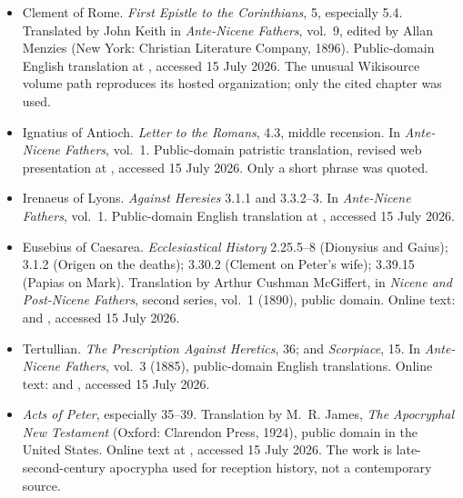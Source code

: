 \begin{itemize}
\item Clement of Rome. \emph{First Epistle to the Corinthians}, 5, especially
  5.4. Translated by John Keith in \emph{Ante-Nicene Fathers}, vol.~9, edited
  by Allan Menzies (New York: Christian Literature Company, 1896).
  Public-domain English translation at
  ,
  accessed 15 July 2026. The unusual Wikisource volume path reproduces its
  hosted organization; only the cited chapter was used.

\item Ignatius of Antioch. \emph{Letter to the Romans}, 4.3, middle recension.
  In \emph{Ante-Nicene Fathers}, vol.~1. Public-domain patristic translation,
  revised web presentation at
  , accessed
  15 July 2026. Only a short phrase was quoted.

\item Irenaeus of Lyons. \emph{Against Heresies} 3.1.1 and 3.3.2--3. In
  \emph{Ante-Nicene Fathers}, vol.~1. Public-domain English translation at
  ,
  accessed 15 July 2026.

\item Eusebius of Caesarea. \emph{Ecclesiastical History} 2.25.5--8
  (Dionysius and Gaius); 3.1.2 (Origen on the deaths); 3.30.2 (Clement on
  Peter's wife); 3.39.15 (Papias on Mark). Translation by Arthur Cushman
  McGiffert, in \emph{Nicene and Post-Nicene Fathers}, second series, vol.~1
  (1890), public domain. Online text:
   and
  , accessed
  15 July 2026.

\item Tertullian. \emph{The Prescription Against Heretics}, 36; and
  \emph{Scorpiace}, 15. In \emph{Ante-Nicene Fathers}, vol.~3 (1885),
  public-domain English translations. Online text:
   and
  , accessed
  15 July 2026.

\item \emph{Acts of Peter}, especially 35--39. Translation by M.~R. James,
  \emph{The Apocryphal New Testament} (Oxford: Clarendon Press, 1924), public
  domain in the United States. Online text at
  ,
  accessed 15 July 2026. The work is late-second-century apocrypha used for
  reception history, not a contemporary source.


\end{itemize}
